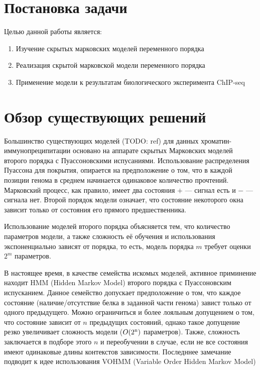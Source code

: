 \documentclass{matmex-diploma-custom}
\begin{document}
\section{Постановка задачи}
Целью данной работы является:
\begin{enumerate}
\item
Изучение скрытых марковских моделей переменного порядка
\item
Реализация скрытой марковской модели переменного порядка
\item
Применение модели к результатам биологического эксперимента ChIP-seq 
\end{enumerate}

\section{Обзор существующих решений}
Большинство существующих моделей (TODO: ref) для данных
хроматин-иммунопреципитации основано на аппарате скрытых Марковских моделей
второго порядка с Пуассоновскими испусаниями. Использование распределения
Пуассона для покрытия, опирается на предположение о том, что в каждой
позиции генома в среднем начинается одинаковое количество прочтений. Марковский
процесс, как правило, имеет два состояния $+$ --- сигнал есть и $-$ --- сигнала
нет. Второй порядок модели означает, что состояние некоторого окна зависит только
от состояния его прямого предшественника.

Использование моделей второго порядка объясняется тем, что количество параметров
модели, а также сложность её обучения и использования экспоненциально зависят от
порядка, то есть, модель порядка $m$ требует оценки $2^m$ параметров.


В настоящее время, в качестве семейства искомых моделей, активное приминение находит HMM (Hidden Markov Model)\cite{Rabiner1989} второго порядка с Пуассоновским испусканием.
Данное семейство допускает предположение о том, что каждое состояние (наличие/отсутствие белка в заданной части генома) завист только от одного предыдущего.
Можно ограничиться и более лояльным допущением о том, что состояние зависит от $n$ предыдущих состояний, однако такое допущение резко увеличивает сложность модели ($O(2\textsuperscript{n})$ параметров). Также, сложность заключается в подборе этого $n$ и переобучении в случае, если не все состояния имеют одинаковые длины контекстов зависимости.
Последннее замечание подводит к идее использования VOHMM (Variable Order Hidden Markov Model)\cite{Wang2006}
\end{document}

